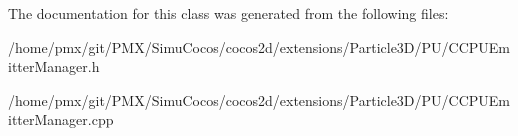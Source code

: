 The documentation for this class was generated from the following files\+:\begin{DoxyCompactItemize}
\item 
/home/pmx/git/\+P\+M\+X/\+Simu\+Cocos/cocos2d/extensions/\+Particle3\+D/\+P\+U/C\+C\+P\+U\+Emitter\+Manager.\+h\item 
/home/pmx/git/\+P\+M\+X/\+Simu\+Cocos/cocos2d/extensions/\+Particle3\+D/\+P\+U/C\+C\+P\+U\+Emitter\+Manager.\+cpp\end{DoxyCompactItemize}
